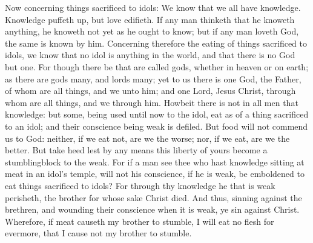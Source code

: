 Now concerning things sacrificed to idols: We know that we all have knowledge. Knowledge puffeth up, but love edifieth. If any man thinketh that he knoweth anything, he knoweth not yet as he ought to know; but if any man loveth God, the same is known by him. Concerning therefore the eating of things sacrificed to idols, we know that no idol is anything in the world, and that there is no God but one. For though there be that are called gods, whether in heaven or on earth; as there are gods many, and lords many; yet to us there is one God, the Father, of whom are all things, and we unto him; and one Lord, Jesus Christ, through whom are all things, and we through him. Howbeit there is not in all men that knowledge: but some, being used until now to the idol, eat as of a thing sacrificed to an idol; and their conscience being weak is defiled. But food will not commend us to God: neither, if we eat not, are we the worse; nor, if we eat, are we the better. But take heed lest by any means this liberty of yours become a stumblingblock to the weak. For if a man see thee who hast knowledge sitting at meat in an idol’s temple, will not his conscience, if he is weak, be emboldened to eat things sacrificed to idols? For through thy knowledge he that is weak perisheth, the brother for whose sake Christ died. And thus, sinning against the brethren, and wounding their conscience when it is weak, ye sin against Christ. Wherefore, if meat causeth my brother to stumble, I will eat no flesh for evermore, that I cause not my brother to stumble. 

